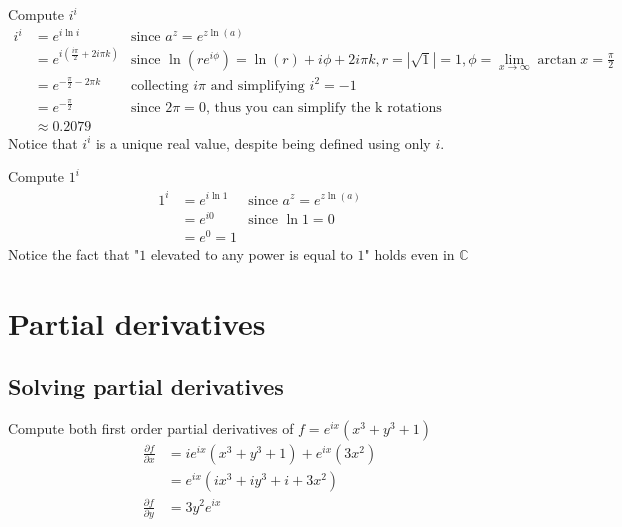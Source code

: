   Compute $i^i$
  \begin{align*}
    i^i & = e^{i\ln i}
        & \text{since } a^z = e^{z\ln(a)} \\
        & = e^{i\left(\frac{i\pi}{2} + 2i\pi k\right)}
        & \text{since } \ln(re^{i\phi}) = \ln(r) + i\phi + 2i\pi k, 
                        r = |\sqrt1| = 1, 
                        \phi = \lim_{x \to \infty}\arctan{x} = \frac{\pi}{2} \\
        & = e^{-\frac{\pi}{2}-2\pi k}
        & \text{collecting } i\pi \text{ and simplifying } i^2 = -1 \\
        & = e^{-\frac{\pi}{2}}
        & \text{since } 2\pi = 0 \text{, thus you can simplify the k rotations} \\
        & \approx 0.2079
  \end{align*}
  Notice that $i^i$ is a unique real value, despite being defined using only $i$.

  Compute $1^i$
  \begin{align*}
    1^i & = e^{i\ln 1}
        & \text{since } a^z = e^{z\ln(a)} \\
        & = e^{i0}
        & \text{since } \ln1 = 0 \\
        & = e^{0} = 1
  \end{align*}
  Notice the fact that "$1$ elevated to any power is equal to $1$" holds even in $\mathbb{C}$


\section{Partial derivatives}

  \subsection{Solving partial derivatives}
  Compute both first order partial derivatives of $f = e^{ix}(x^3 + y^3 + 1)$
  \begin{align*}
    \frac{\partial f}{\partial x} & = ie^{ix}(x^3 + y^3 + 1) + e^{ix}(3x^2) \\
                                  & = e^{ix}(ix^3 + iy^3 + i + 3x^2) \\
    \frac{\partial f}{\partial y} & = 3y^2e^{ix} \\
  \end{align*}

